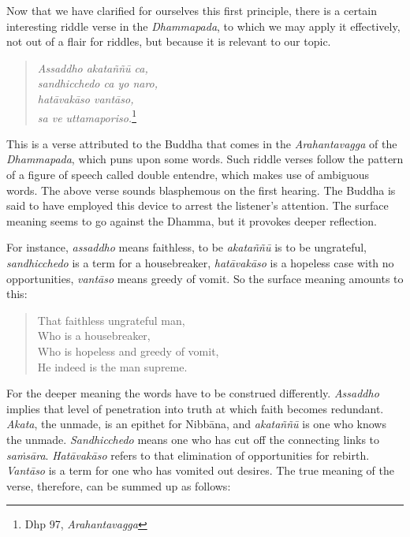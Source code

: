 Now that we have clarified for ourselves this first principle, there is a certain interesting riddle verse in the \emph{Dhammapada}, to which we may apply it effectively, not out of a flair for riddles, but because it is relevant to our topic.

\begin{quote}
\emph{Assaddho akataññū ca,}\\
\emph{sandhicchedo ca yo naro,}\\
\emph{hatāvakāso vantāso,}\\
\emph{sa ve uttamaporiso.}\footnote{Dhp 97, \emph{Arahantavagga}}
\end{quote}

This is a verse attributed to the Buddha that comes in the \emph{Arahantavagga} of the \emph{Dhammapada}, which puns upon some words. Such riddle verses follow the pattern of a figure of speech called double entendre, which makes use of ambiguous words. The above verse sounds blasphemous on the first hearing. The Buddha is said to have employed this device to arrest the listener's attention. The surface meaning seems to go against the Dhamma, but it provokes deeper reflection.

For instance, \emph{assaddho} means faithless, to be \emph{akataññū} is to be ungrateful, \emph{sandhicchedo} is a term for a housebreaker, \emph{hatāvakāso} is a hopeless case with no opportunities, \emph{vantāso} means greedy of vomit. So the surface meaning amounts to this:

\begin{quote}
That faithless ungrateful man,\\
Who is a housebreaker,\\
Who is hopeless and greedy of vomit,\\
He indeed is the man supreme.
\end{quote}

For the deeper meaning the words have to be construed differently. \emph{Assaddho} implies that level of penetration into truth at which faith becomes redundant. \emph{Akata}, the unmade, is an epithet for Nibbāna, and \emph{akataññū} is one who knows the unmade. \emph{Sandhicchedo} means one who has cut off the connecting links to \emph{saṁsāra}. \emph{Hatāvakāso} refers to that elimination of opportunities for rebirth. \emph{Vantāso} is a term for one who has vomited out desires. The true meaning of the verse, therefore, can be summed up as follows:

\enlargethispage{\baselineskip}

